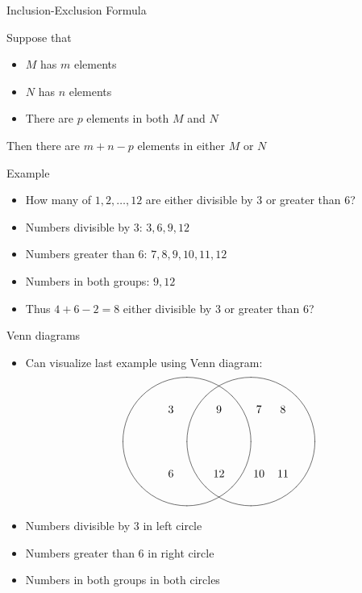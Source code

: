 \documentclass[handout]{beamer}
\theoremstyle{definition}
\begin{document}
\begin{frame}{Inclusion-Exclusion Formula}
\begin{theorem}
Suppose that
\begin{itemize}
\item $M$ has $m$ elements 
\item $N$ has $n$ elements
\item There are $p$ elements in \alert{both} $M$ and $N$
\end{itemize}
Then there are $m+n-p$ elements in \alert{either} $M$ or $N$
\end{theorem}
\end{frame}

\begin{frame}{Example}
\begin{itemize}
\item How many of $1,2,\ldots,12$ are
either divisible by $3$ or greater than $6$?
\item Numbers divisible by $3$: $3,6,9,12$
\item Numbers greater than $6$: $7,8,9,10,11,12$
\item Numbers in both groups: $9,12$
\item Thus $4+6-2=8$
either divisible by $3$ or greater than $6$?
\end{itemize}
\end{frame}

\begin{frame}{Venn diagrams}
\begin{itemize}
\item Can visualize last example using Venn diagram:
\[\begin{xy}<1cm,0cm>:
(-1,0)*\cir<2cm>{};
(1,0)*\cir<2cm>{};
(-1.5,1)*{3};
(-1.5,-1)*{6};
(0,1)*{9};
(0,-1)*{12};
(1.25,1)*{7};
(1.25,-1)*{10};
(2,1)*{8};
(2,-1)*{11};
\end{xy}\]
\item Numbers divisible by $3$ in left circle
\item Numbers greater than $6$ in right circle
\item Numbers in both groups in both circles
\end{itemize}
\end{frame}
\end{document}
